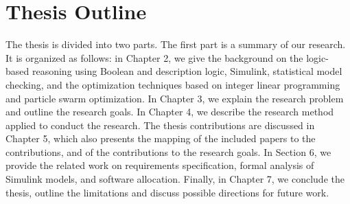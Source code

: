 
\section{Thesis Outline}
The thesis is divided into two parts. The first part is a summary of our research. It is organized as follows: in Chapter 2, we give the background on the logic-based reasoning using Boolean and description logic, Simulink, \uppaal statistical model checking, and the optimization techniques based on integer linear programming and particle swarm optimization. In Chapter 3, we explain the research problem and outline the research goals. In Chapter 4, we describe the research method applied to conduct the research. The thesis contributions are discussed in Chapter 5, which also presents the mapping of the included papers to the contributions, and of the contributions to the research goals. In Section 6, we provide the related work on requirements specification, formal analysis of Simulink models, and software allocation.  Finally, in Chapter 7, we conclude the thesis, outline the limitations and discuss possible directions for future work.


